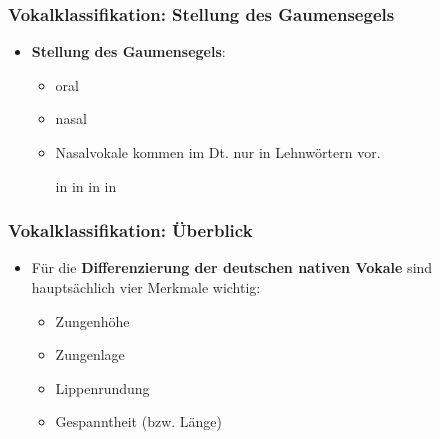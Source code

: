 \begin{frame}
\frametitle{Vokalklassifikation: Stellung des Gaumensegels}

	\begin{itemize}
	
		
		
		\item \textbf{Stellung des Gaumensegels}:
		
		\begin{itemize}
			\item oral
			\item nasal
			
			\item Nasalvokale kommen im Dt. nur in Lehnwörtern vor.

			\eal
			\ex \textipa{[ \~a ]} in 
			\ex \textipa{[ \~E ]} in 
			\ex \textipa{[ \~a ]} in 
			\ex \textipa{[ \~\oe\ ]} in 
			\zl
		
		\end{itemize}
		
	\end{itemize}
	
\end{frame}


\begin{frame}
\frametitle{Vokalklassifikation: Überblick}

	\begin{itemize}
		\item Für die \textbf{Differenzierung der deutschen nativen Vokale} sind hauptsächlich vier Merkmale wichtig:
		
		\begin{itemize}
			
			\item Zungenhöhe
			
			\item Zungenlage
			
			\item Lippenrundung
			
			\item Gespanntheit (bzw. Länge)
		\end{itemize}
		
	\end{itemize}
	
\end{frame}


